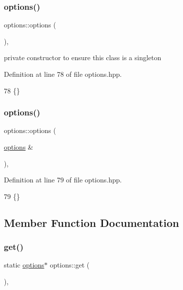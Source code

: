 \subsubsection{\texorpdfstring{options()}{options()}\hspace{0.1cm}{\footnotesize\ttfamily [1/2]}}
{\footnotesize\ttfamily options\+::options (\begin{DoxyParamCaption}{ }\end{DoxyParamCaption})\hspace{0.3cm}{\ttfamily [inline]}, {\ttfamily [private]}}



private constructor to ensure this class is a singleton 



Definition at line 78 of file options.\+hpp.


\begin{DoxyCode}
78 \{\}
\end{DoxyCode}
\mbox{\label{classoptions_a561b67397b31bd4ec2c058ad54ab2daa}} 
\subsubsection{\texorpdfstring{options()}{options()}\hspace{0.1cm}{\footnotesize\ttfamily [2/2]}}
{\footnotesize\ttfamily options\+::options (\begin{DoxyParamCaption}\item[{\hyperlink{classoptions}{options} \&}]{ }\end{DoxyParamCaption})\hspace{0.3cm}{\ttfamily [inline]}, {\ttfamily [private]}}



Definition at line 79 of file options.\+hpp.


\begin{DoxyCode}
79 \{\}
\end{DoxyCode}


\subsection{Member Function Documentation}
\mbox{\label{classoptions_a9ecfe9c365269df68a41b961c31ae3f5}} 
\subsubsection{\texorpdfstring{get()}{get()}}
{\footnotesize\ttfamily static \hyperlink{classoptions}{options}$\ast$ options\+::get (\begin{DoxyParamCaption}{ }\end{DoxyParamCaption})\hspace{0.3cm}{\ttfamily [inline]}, {\ttfamily [static]}}



